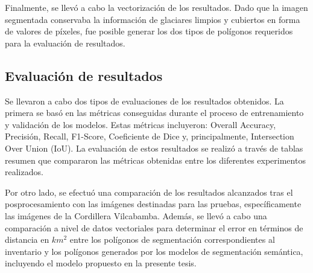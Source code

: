 Finalmente, se llevó a cabo la vectorización de los resultados. Dado que la imagen segmentada conservaba la información de glaciares limpios y cubiertos en forma de valores de píxeles, fue posible generar los dos tipos de polígonos requeridos para la evaluación de resultados.

\subsection{Evaluación de resultados}

Se llevaron a cabo dos tipos de evaluaciones de los resultados obtenidos. La primera se basó en las métricas conseguidas durante el proceso de entrenamiento y validación de los modelos. Estas métricas incluyeron: Overall Accuracy, Precisión, Recall, F1-Score, Coeficiente de Dice y, principalmente, Intersection Over Union (IoU). La evaluación de estos resultados se realizó a través de tablas resumen que compararon las métricas obtenidas entre los diferentes experimentos realizados.

Por otro lado, se efectuó una comparación de los resultados alcanzados tras el posprocesamiento con las imágenes destinadas para las pruebas, específicamente las imágenes de la Cordillera Vilcabamba. Además, se llevó a cabo una comparación a nivel de datos vectoriales para determinar el error en términos de distancia en $km^2$ entre los polígonos de segmentación correspondientes al inventario y los polígonos generados por los modelos de segmentación semántica, incluyendo el modelo propuesto en la presente tesis.
